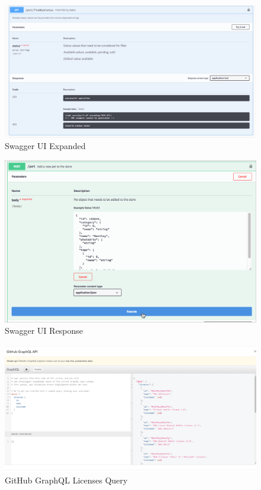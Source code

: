 \begin{figure}[!ht]
  \centering\includegraphics[width=\columnwidth]{images/swaggerui-expansion.png}
  \caption{Swagger UI Expanded}\label{f:swaggerui-expansion}
\end{figure}

\begin{figure}[!ht]
  \centering\includegraphics[width=\columnwidth]{images/swaggerui_execute.png}
  \caption{Swagger UI Response}\label{f:swagger-resp}
\end{figure}

\begin{figure}[!ht]
  \centering\includegraphics[width=\columnwidth]{images/github-graphql-1.png}
  \caption{GitHub GraphQL Licenses Query}\label{f:github-graphql-1}
\end{figure}

